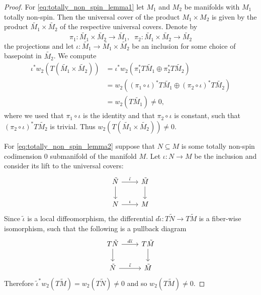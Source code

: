 \begin{proof}%
    For \ref{eq:totally_non_spin_lemma1} let $M_1$ and $M_2$ be manifolds with $M_1$ totally non-spin. Then the universal cover of the product $M_1 \times M_2$ is given by the product $\tilde{M_1} \times \tilde{M_2}$ of the respective universal covers. Denote by 
    \[
    \pi_1 \colon \tilde{M_1} \times \tilde{M_2} \to \tilde{M_1}, \; \;  \pi_2 \colon \tilde{M_1} \times \tilde{M_2} \to \tilde{M_2}
    \]
    the projections and let $\iota \colon \tilde{M_1} \to \tilde{M_1} \times \tilde{M_2}$ be an inclusion for some choice of basepoint in $\tilde{M_2}$. We compute 
    \begin{align*}
    \iota^\ast w_2(T(\tilde{M_1} \times \tilde{M_2})) & = \iota^\ast w_2(\pi_1^\ast T \tilde{M_1} \oplus \pi_2^\ast T \tilde{M_2}) \\
    & = w_2((\pi_1 \circ \iota)^\ast T\tilde{M_1} \oplus (\pi_2 \circ \iota)^\ast T\tilde{M_2} ) \\
    & = w_2(T \tilde{M_1}) \neq 0,
    \end{align*}
    where we used that $\pi_1 \circ \iota$ is the identity and that $\pi_2 \circ \iota$ is constant, such that $(\pi_2 \circ \iota)^\ast T\tilde{M_2}$ is trivial. Thus $w_2(T(\tilde{M_1} \times \tilde{M_2})) \neq 0$.

    For \ref{eq:totally_non_spin_lemma2} suppose that $N \subseteq M$ is some totally non-spin codimension $0$ submanifold of the manifold $M$. Let $\iota \colon N \to M$ be the inclusion and consider its lift to the universal covers:
    \[\begin{tikzcd}
	{\tilde{N}} & {\tilde{M}} \\
	N & M
	\arrow["{\tilde{\iota}}", from=1-1, to=1-2]
	\arrow[from=1-1, to=2-1]
	\arrow[from=1-2, to=2-2]
	\arrow["\iota", from=2-1, to=2-2]
    \end{tikzcd}\]
    Since $\tilde{\iota}$ is a local diffeomorphism, the differential $d \tilde{\iota} \colon T\tilde{N} \to T\tilde{M}$ is a fiber-wise isomorphism, such that the following is a pullback diagram
    \[\begin{tikzcd}
	{T\tilde{N}} & {T\tilde{M}} \\
	{\tilde{N}} & {\tilde{M}}
	\arrow["{d \tilde{\iota}}", from=1-1, to=1-2]
	\arrow[from=1-1, to=2-1]
	\arrow[from=1-2, to=2-2]
	\arrow["{\tilde{\iota}}", from=2-1, to=2-2]
    \end{tikzcd}\]
    Therefore $\tilde{\iota}^\ast w_2(T\tilde{M}) = w_2(T\tilde{N}) \neq 0$ and so $w_2(T\tilde{M}) \neq 0$.


\end{proof}
